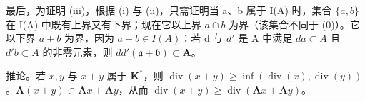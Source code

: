 最后，为证明 (iii)，根据 (i) 与 (ii)，只需证明当 a、b 属于 I(A) 时，集合 \(\{a, b\}\) 在 I(A) 中既有上界又有下界；现在它以上界 \(a \cap b\) 为界（该集合不同于 (0)）。它以下界 \(a + b\) 为界，因为 \(a + b \in I(A)\)：若 d 与 \(d'\) 是 A 中满足 \(da \subset A\) 且 \(d'b \subset A\) 的非零元素，则 \(dd'(\mathfrak{a} + \mathfrak{b}) \subset \mathbf{A}\)。

推论。若 \(x, y\) 与 \(x + y\) 属于 \(\mathbf{K}^*\)，则 \(\operatorname{div}(x + y) \geqslant \inf(\operatorname{div}(x), \operatorname{div}(y))\)。\(\mathbf{A}(x + y) \subset \mathbf{A}x + \mathbf{A}y\)，从而 \(\operatorname{div}(x + y) \geqslant \operatorname{div}(\mathbf{A}x + \mathbf{A}y)\)。
\relax{}
